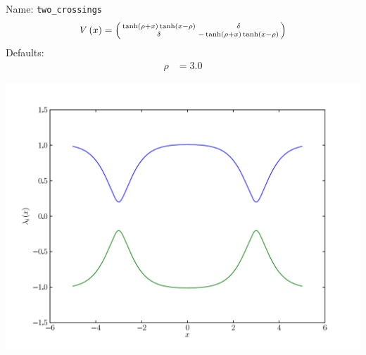 \documentclass[a4paper,10pt]{report}
\begin{document}
\begin{minipage}{0.75\linewidth}
  Name:    \texttt{two\_crossings}
  \begin{equation*}
    V\left( x \right) = \left(\begin{smallmatrix}\operatorname{tanh}\left(\rho + x\right) \operatorname{tanh}\left(x - \rho\right) & \delta\\\delta & - \operatorname{tanh}\left(\rho + x\right) \operatorname{tanh}\left(x - \rho\right)\end{smallmatrix}\right)
  \end{equation*}
  Defaults:
  \begin{align*}
    \rho & = 3.0
  \end{align*}
\end{minipage}
\begin{minipage}{0.25\linewidth}
  \begin{center}
    \includegraphics[scale=0.25]{./fig/two_crossings.pdf}
  \end{center}
\end{minipage}
\end{document}
